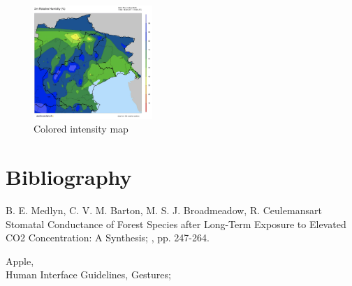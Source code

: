 \documentclass[12pt]{article} %
\begin{document}
\begin{figure}[H]
  \centering
  \includegraphics[width=0.4\textwidth]{img/lol.png}
  \caption{Colored intensity map}
  \label{fig:boat1}
\end{figure}

\newpage
\section{Bibliography}
\begin{thebibliography}{99} %

\bibitem B. E. Medlyn, C. V. M. Barton, M. S. J. Broadmeadow, R. Ceulemans{art}
Stomatal Conductance of Forest Species after Long-Term Exposure to Elevated CO2 Concentration: A Synthesis;
,  pp. 247-264.

\bibitem {}
Apple,\\ Human Interface Guidelines, Gestures; \\

 
\end{thebibliography}

\end{document}

